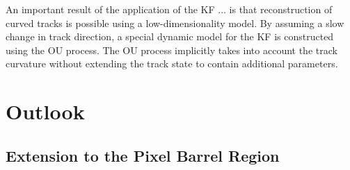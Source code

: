 An important result of the application of the KF ... is that reconstruction of curved tracks is possible using a low-dimensionality model. By assuming a slow change in track direction, a special dynamic model for the KF is constructed using the OU process. The OU process implicitly takes into account the track curvature without extending the track state to contain additional parameters.







\section{Outlook}
\label{chapter-7-outlook}

\subsection{Extension to the Pixel Barrel Region}



